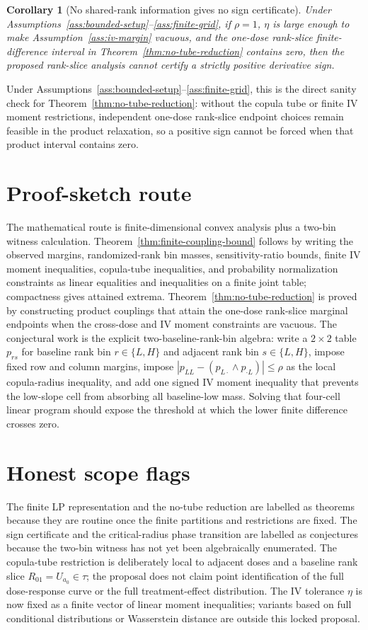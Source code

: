 \documentclass[11pt]{article}
\theoremstyle{definition}
\theoremstyle{plain}
\newtheorem{corollary}{Corollary}
\theoremstyle{remark}
\begin{document}
\begin{corollary}[No shared-rank information gives no sign certificate]\label{cor:no-rank-no-sign}
Under Assumptions~\ref{ass:bounded-setup}--\ref{ass:finite-grid}, if \(\rho=1\), \(\eta\) is large enough to make Assumption~\ref{ass:iv-margin} vacuous, and the one-dose rank-slice finite-difference interval in Theorem~\ref{thm:no-tube-reduction} contains zero, then the proposed rank-slice analysis cannot certify a strictly positive derivative sign.
\end{corollary}

Under Assumptions~\ref{ass:bounded-setup}--\ref{ass:finite-grid}, this is the direct sanity check for Theorem~\ref{thm:no-tube-reduction}: without the copula tube or finite IV moment restrictions, independent one-dose rank-slice endpoint choices remain feasible in the product relaxation, so a positive sign cannot be forced when that product interval contains zero.

\section{Proof-sketch route}
The mathematical route is finite-dimensional convex analysis plus a two-bin witness calculation.  Theorem~\ref{thm:finite-coupling-bound} follows by writing the observed margins, randomized-rank bin masses, sensitivity-ratio bounds, finite IV moment inequalities, copula-tube inequalities, and probability normalization constraints as linear equalities and inequalities on a finite joint table; compactness gives attained extrema.  Theorem~\ref{thm:no-tube-reduction} is proved by constructing product couplings that attain the one-dose rank-slice marginal endpoints when the cross-dose and IV moment constraints are vacuous.  The conjectural work is the explicit two-baseline-rank-bin algebra: write a \(2\times2\) table \(p_{rs}\) for baseline rank bin \(r\in\{L,H\}\) and adjacent rank bin \(s\in\{L,H\}\), impose fixed row and column margins, impose \(|p_{LL}-(p_{L\cdot}\wedge p_{\cdot L})|\le\rho\) as the local copula-radius inequality, and add one signed IV moment inequality that prevents the low-slope cell from absorbing all baseline-low mass.  Solving that four-cell linear program should expose the threshold at which the lower finite difference crosses zero.

\section{Honest scope flags}
The finite LP representation and the no-tube reduction are labelled as theorems because they are routine once the finite partitions and restrictions are fixed.  The sign certificate and the critical-radius phase transition are labelled as conjectures because the two-bin witness has not yet been algebraically enumerated.  The copula-tube restriction is deliberately local to adjacent doses and a baseline rank slice \(R_{01}=U_{a_0}\in\tau\); the proposal does not claim point identification of the full dose-response curve or the full treatment-effect distribution.  The IV tolerance \(\eta\) is now fixed as a finite vector of linear moment inequalities; variants based on full conditional distributions or Wasserstein distance are outside this locked proposal.
\end{document}
